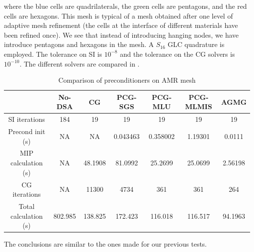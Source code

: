 where the blue cells are quadrilaterals, the green cells are pentagons, and
the red cells are hexagons. This mesh is typical of a mesh obtained after one 
level of adaptive mesh
refinement (the cells at the interface of different materials have been refined
once). We see that instead of introducing hanging nodes, we have introduce
pentagons and hexagons in the mesh.
A $S_{16}$ GLC quadrature is employed. The tolerance on SI is $10^{-8}$ and
the tolerance on the CG solvers is $10^{-10}$.
The different solvers are compared in .
\begin{table}[H]
  \caption{Comparison of preconditioners on AMR mesh}
  \begin{center}
    \begin{tabular}{|c|c|c|c|c|c|c|}
      \hline
       & No-DSA & CG & PCG-SGS & PCG-MLU & PCG-MLMIS & AGMG \\
      \hline
   SI iterations & 184     & 19      & 19       & 19      & 19       & 19 \\
Precond init (s) & NA      & NA      & 0.043463 & 0.358002 & 1.19301 & 0.0111\\
MIP calculation (s) & NA   & 48.1908 & 81.0992  & 25.2699 & 25.0699  & 
      2.56198\\
   CG iterations & NA      & 11300   & 4734     & 361     & 361      & 264 \\
     Total calculation (s) & 802.985 & 138.825 & 172.423  & 116.018 & 116.517  &
      94.1963\\
      \hline
    \end{tabular}
    \label{table_amr}
  \end{center}
\end{table}
The conclusions are similar to the ones made for our previous tests.

